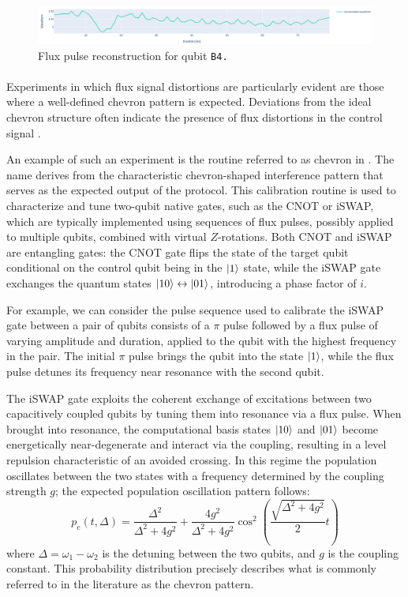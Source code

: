 \begin{figure}[h!]
    \centering
    \includegraphics[width=\textwidth]{figures/png/Cryoscope/flux_B4.png}
    \caption{Flux pulse reconstruction for qubit \tt{B4}.}
    \label{fig:flux:B4}
\end{figure} 

\paragraph{}
Experiments in which flux signal distortions are particularly evident are those where a well-defined chevron pattern is expected. 
Deviations from the ideal chevron structure often indicate the presence of flux distortions in the control signal \cite{Langford2017}.

An example of such an experiment is the routine referred to as chevron in \Qibocal. The name derives from the characteristic chevron-shaped interference pattern that serves as the expected output of the protocol.
This calibration routine is used to characterize and tune two-qubit native gates, such as the CNOT or iSWAP, which are typically implemented using sequences of flux pulses, possibly applied to multiple qubits, combined with virtual $Z$-rotations.
Both CNOT and iSWAP are entangling gates: the CNOT gate flips the state of the target qubit conditional on the control qubit being in the $\ket{1}$ state, while the iSWAP gate exchanges the quantum states $\ket{10} \leftrightarrow \ket{01}$, introducing a phase factor of $i$.

For example, we can consider the pulse sequence used to calibrate the iSWAP gate between a pair of qubits consists of a $\pi$ pulse followed by a flux pulse of varying amplitude and duration, applied to the qubit with the highest frequency in the pair. 
The initial $\pi$ pulse brings the qubit into the state $\ket{1}$, while the flux pulse detunes its frequency near resonance with the second qubit. 

The iSWAP gate exploits the coherent exchange of excitations between two capacitively coupled qubits by tuning them into resonance via a flux pulse. 
When brought into resonance, the computational basis states $\ket{10}$ and $\ket{01}$ become energetically near-degenerate and interact via the coupling, resulting in a level repulsion characteristic of an avoided crossing.
In this regime the population oscillates between the two states with a frequency determined by the coupling strength $g$; the expected population oscillation pattern follows:
\begin{equation}
    p_e(t, \Delta) = \frac{\Delta^2}{\Delta^2 + 4g^2} + \frac{4g^2}{\Delta^2 + 4g^2} \cos^2\left(\frac{\sqrt{\Delta^2 + 4g^2}}{2}t\right)
\end{equation}
where $\Delta = \omega_1 - \omega_2$ is the detuning between the two qubits, and $g$ is the coupling constant. This probability distribution precisely describes what is commonly referred to in the literature as the chevron pattern.


